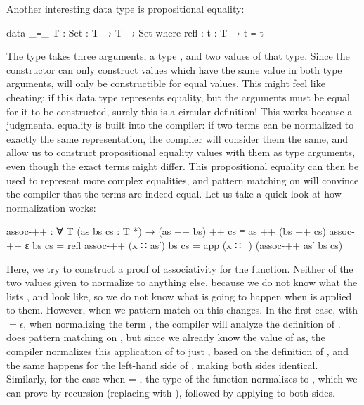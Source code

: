 		Another interesting data type is propositional equality:

		\begin{code}
			data _≡_ {T : Set} : T → T → Set where
			  refl : {t : T} → t ≡ t
		\end{code}

		The type  takes three arguments, a type , and
		two values of that type. Since the constructor can only construct
		values which have the same value in both type arguments, 
		will only be constructible for equal values. This might feel
		like cheating: if this data type represents equality, but the arguments
		must be equal for it to be constructed, surely this is a circular
		definition! This works because a judgmental equality is built
		into the compiler: if two terms can be normalized to exactly the same
		representation, the compiler will consider them the same, and allow us
		to construct propositional equality values with them as type arguments,
		even though the exact terms might differ. This propositional equality
		can then be used to represent more complex equalities, and pattern
		matching on  will convince the compiler that the terms are
		indeed equal. Let us take a quick look at how normalization works:

		\begin{code}
			assoc-++ : ∀ {T} (as bs cs : T *) → (as ++ bs) ++ cs ≡ as ++ (bs ++ cs)
			assoc-++ ε          bs cs = refl
			assoc-++ (x ∷ as′)  bs cs = app (x ∷_) (assoc-++ as′ bs cs)
		\end{code}

	 	Here, we try to construct a proof of associativity for the
	 	\codett{\_++\_} function. Neither of the two values given to
	 	 normalize to anything else, because we do not know what
	 	the lists ,  and  look like, so we do
	 	not know what is going to happen when \codett{\_++\_} is applied to
	 	them.  However, when we pattern-match on  this changes. In
	 	the first case, with  $=\epsilon$, when normalizing the term
	 	, the compiler will analyze the definition of
	 	\codett{\_++\_}. \codett{\_++\_} does pattern matching on ,
	 	but since we already know the value of as, the compiler normalizes this
	 	application of \codett{\_++\_} to just , based on the
	 	definition of \codett{\_++\_}, and the same happens for the left-hand
	 	side of , making both sides identical.  Similarly, for
	 	the case when  = , the type of the function
	 	normalizes to , which we can prove by recursion (replacing  with
	 	), followed by applying  to both sides.
